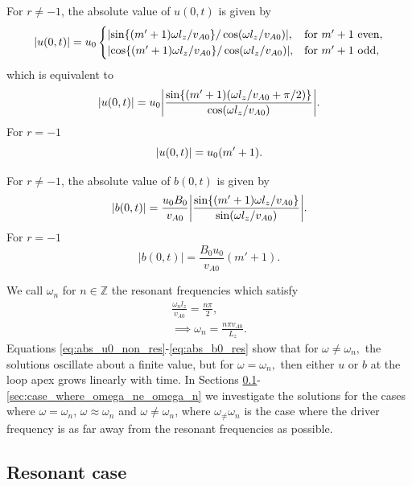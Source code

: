 For $r\ne-1$, the absolute value of $u(0,t)$ is given by
\begin{equation}
    \abs{u(0,t)}=u_0
    \begin{cases}
    \abs{\sin\{(m'+1)\omega l_z/v_{A0}\}/\cos(\omega l_z/v_{A0})}, &\text{for}\ m'+1\ \text{even}, \\
    \abs{\cos\{(m'+1)\omega l_z/v_{A0}\}/\cos(\omega l_z/v_{A0})}, &\text{for}\ m'+1\ \text{odd}, \\
    \end{cases}
\end{equation}
which is equivalent to
\begin{equation}
    \label{eq:abs_u0_non_res}
    \abs{u(0,t)}=u_0\abs{\frac{\sin\{(m'+1)(\omega l_z/v_{A0}+\pi/2)\}}{\cos(\omega l_z/v_{A0})}}.
\end{equation}
For $r=-1$
\begin{equation}
     \abs{u(0,t)}=u_0(m'+1).
\end{equation}

For $r\ne-1$, the absolute value of $b(0,t)$ is given by
\begin{equation}
    \label{eq:abs_b0_non_res}
    \abs{b(0,t)}=\frac{u_0 B_0}{v_{A0}}\abs{\frac{\sin\{(m'+1)\omega l_z/v_{A0}\}}{\sin(\omega l_z/v_{A0})}}.
\end{equation}
For $r=-1$
\begin{equation}
    \label{eq:abs_b0_res}
    |b(0,t)|=\frac{B_0 u_0}{v_{A0}}(m'+1).
\end{equation}

We call $\omega_n$ for $n\in \mathds{Z}$ the resonant frequencies which satisfy
\begin{gather}
    \frac{\omega_n l_z}{v_{A0}}=\frac{n\pi}{2}, \\
    \label{eq:chap_2_omega_n}
    \implies \omega_n = \frac{n\pi v_{A0}}{L_z}.
\end{gather}
Equations \eqref{eq:abs_u0_non_res}-\eqref{eq:abs_b0_res} show that for $\omega\ne\omega_n,$
the solutions oscillate about a finite value, but for $\omega=\omega_n,$
then either $u$ or $b$ at the loop apex grows linearly with time. In Sections \ref{sec:case_where_omega=omega_n}-\ref{sec:case_where_omega_ne_omega_n} we investigate the solutions for the cases where $\omega=\omega_n$, $\omega\approx\omega_n$ and $\omega\ne\omega_n$, where $\omega_\ne \omega_n$ is the case where the driver frequency is as far away from the resonant frequencies as possible.

\subsection{Resonant case}
\label{sec:case_where_omega=omega_n}

